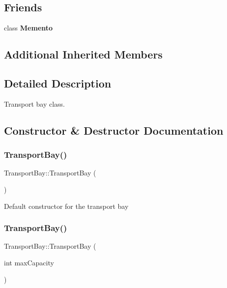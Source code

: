 \subsection*{Friends}
\begin{DoxyCompactItemize}
\item 
\mbox{\label{classTransportBay_a15ea7cda491e1c5873aeba1aad9d457a}} 
class {\bfseries Memento}
\end{DoxyCompactItemize}
\subsection*{Additional Inherited Members}


\subsection{Detailed Description}
Transport bay class. 

\subsection{Constructor \& Destructor Documentation}
\mbox{\label{classTransportBay_a878d1695b58a12ccd698a85f9e01ffb6}} 
\subsubsection{\texorpdfstring{Transport\+Bay()}{TransportBay()}\hspace{0.1cm}{\footnotesize\ttfamily [1/2]}}
{\footnotesize\ttfamily Transport\+Bay\+::\+Transport\+Bay (\begin{DoxyParamCaption}{ }\end{DoxyParamCaption})}

Default constructor for the transport bay \mbox{\label{classTransportBay_a731f9665c1fb62d3c533f1323a8742de}} 
\subsubsection{\texorpdfstring{Transport\+Bay()}{TransportBay()}\hspace{0.1cm}{\footnotesize\ttfamily [2/2]}}
{\footnotesize\ttfamily Transport\+Bay\+::\+Transport\+Bay (\begin{DoxyParamCaption}\item[{int}]{max\+Capacity }\end{DoxyParamCaption})}

